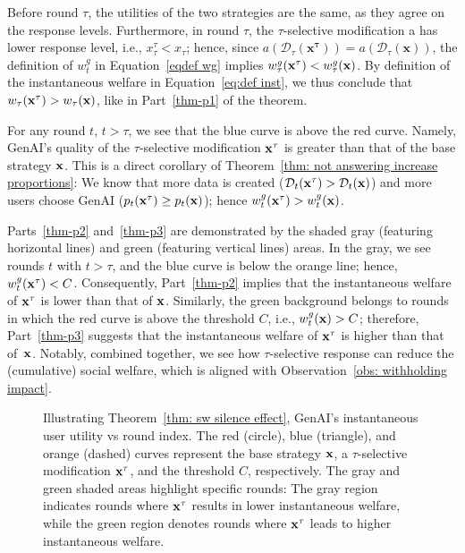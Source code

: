 Before round $\tau$, the utilities of the two strategies are the same, as they agree on the response levels. Furthermore, in round $\tau$, the $\tau$-selective modification a has lower response level, i.e., $x^\tau_\tau < x_\tau$; hence, since $a(\mathcal{D}_\tau(\mathbf{x^\tau}))  = a(\mathcal{D}_\tau(\mathbf{x}))$, the definition of $w^g_t$ in Equation~\eqref{eqdef wg} implies $w^g_{\tau}({\bf{x}}^\tau) < w^g_{\tau}({\bf{x}})$. By definition of the instantaneous welfare in Equation~\eqref{eq:def inst}, we thus conclude that $w_\tau({\bf{x}}^\tau) > w_\tau({\bf{x}})$, like in Part~\ref{thm-p1} of the theorem.

For any round $t$, $t>\tau$, we see that the blue curve is above the red curve. Namely, GenAI's quality of the $\tau$-selective modification ${\bf{x}}^\tau$ is greater than that of the base strategy ${\bf{x}}$. This is a direct corollary of Theorem~\ref{thm: not answering increase proportions}: We know that more data is created ($\mathcal{D}_t({\bf{x}}^\tau) > \mathcal{D}_t({\bf{x}})$) and more users choose GenAI ($p_t({\bf{x}}^\tau) \geq p_t({\bf{x}})$); hence $w^{g}_t({\bf{x}}^\tau) > w^{g}_t({\bf{x}})$. 

Parts~\ref{thm-p2} and~\ref{thm-p3} are demonstrated by the shaded gray (featuring horizontal lines) and green (featuring vertical lines) areas. In the gray, we see rounds $t$ with $t> \tau$, and the blue curve is below the orange line; hence, $w^g_t({\bf{x}}^\tau) < C$. Consequently, Part~\ref{thm-p2} implies that the instantaneous welfare of ${\bf{x}}^\tau$ is lower than that of ${\bf{x}}$. Similarly, the green background belongs to rounds in which the red curve is above the threshold $C$, i.e., $w^g_t({\bf{x}}) > C$; therefore, Part~\ref{thm-p3} suggests that the instantaneous welfare of ${\bf{x}}^\tau$ is higher than that of~${\bf{x}}$. Notably, combined together, we see how $\tau$-selective response can reduce the (cumulative) social welfare, which is aligned with Observation~\ref{obs: withholding impact}. 
\begin{figure}[t]
    \centering
        
        
        \caption{Illustrating Theorem~\ref{thm: sw silence effect}, GenAI's instantaneous user utility vs round index. The red (circle), blue (triangle), and orange (dashed) curves represent the base strategy ${\bf{x}}$, a $\tau$-selective modification ${\bf{x}}^\tau$, and the threshold $C$, respectively. %
        The gray and green shaded areas highlight specific rounds: The gray region indicates rounds where ${\bf{x}}^\tau$ results in lower instantaneous welfare, while the green region denotes rounds where ${\bf{x}}^\tau$ leads to higher instantaneous welfare. \label{fig:welfare+}}
\end{figure}